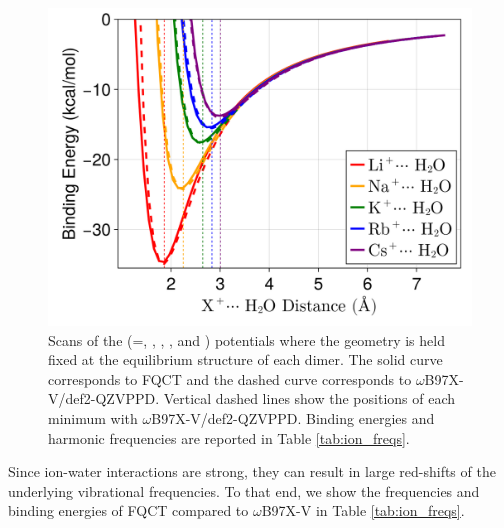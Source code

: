 \documentclass[journal=jctcce,manuscript=article]{achemso}
\begin{document}
\begin{figure}[h]
  \includegraphics*[width=\textwidth]{figures/cation_dimer_scans.png}
  \caption{Scans of the  (=, , , , and )
  potentials where the geometry is held fixed at the equilibrium structure of each dimer.
  The solid curve corresponds to FQCT and the dashed curve corresponds to $\omega$B97X-V/def2-QZVPPD.
  Vertical dashed lines show the positions of each minimum with $\omega$B97X-V/def2-QZVPPD.
  Binding energies and harmonic frequencies are reported in Table \ref{tab:ion_freqs}.
  }\label{fig:alkali_scans}
\end{figure}
Since ion-water interactions are strong, they can result in large red-shifts of the underlying vibrational frequencies. To that end, we show the frequencies and binding energies of FQCT compared to $\omega$B97X-V in Table \ref{tab:ion_freqs}.
\end{document}
